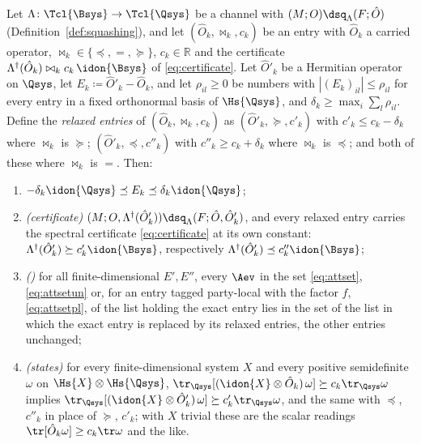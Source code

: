 \begin{lemma}\label{lem:row-relaxation}
Let $\Lambda\colon\Tcl{\Bsys}\to\Tcl{\Qsys}$ be a channel with
$(M;O)\dsq_{\Lambda}(F;\hat O)$ (Definition~\ref{def:squashing}), and let
$(\hat O_k,\bowtie_k,c_k)$ be an entry with $\hat O_k$ a carried operator,
$\bowtie_k\in\{\preceq,=,\succeq\}$, $c_k\in\mathbb{R}$ and the certificate
$\Lambda^{\dagger}(\hat O_k)\bowtie_kc_k\,\idon{\Bsys}$ of
\eqref{eq:certificate}. Let $\hat O'_k$ be a Hermitian operator on $\Qsys$,
let $E_k\coloneqq\hat O'_k-\hat O_k$, and let $\rho_{il}\ge0$ be numbers with
$|(E_k)_{il}|\le\rho_{il}$ for every entry in a fixed orthonormal basis of
$\Hs{\Qsys}$, and $\delta_k\ge\max_i\sum_l\rho_{il}$. Define the
\emph{relaxed entries} of $(\hat O_k,\bowtie_k,c_k)$ as
$(\hat O'_k,\succeq,c'_k)$ with $c'_k\le c_k-\delta_k$ where $\bowtie_k$ is
$\succeq$; $(\hat O'_k,\preceq,c''_k)$ with $c''_k\ge c_k+\delta_k$ where
$\bowtie_k$ is $\preceq$; and both of these where $\bowtie_k$ is $=$. Then:
\begin{enumerate}[label=(\roman*),leftmargin=2.4em]
\item $-\delta_k\idon{\Qsys}\preceq E_k\preceq\delta_k\idon{\Qsys}$;
\item \emph{(certificate)} $(M;O,\Lambda^{\dagger}(\hat O'_k))\dsq_{\Lambda}
  (F;\hat O,\hat O'_k)$, and every relaxed entry carries the spectral
  certificate \eqref{eq:certificate} at its own constant:
  $\Lambda^{\dagger}(\hat O'_k)\succeq c'_k\idon{\Bsys}$, respectively
  $\Lambda^{\dagger}(\hat O'_k)\preceq c''_k\idon{\Bsys}$;
\item \emph{()} for all finite-dimensional $E',E''$, every
  $\Aev$ in the set \eqref{eq:attset}, \eqref{eq:attsetun} or, for an entry
  tagged party-local with the factor $f$, \eqref{eq:attsetpl}, of the list
  holding the exact entry lies in the set of the list in which the exact
  entry is replaced by its relaxed entries, the other entries unchanged;
\item \emph{(states)} for every finite-dimensional system $X$ and every
  positive semidefinite $\omega$ on $\Hs{X}\otimes\Hs{\Qsys}$,
  $\tr_{\Qsys}[(\idon{X}\otimes\hat O_k)\,\omega]\succeq c_k\tr_{\Qsys}\omega$
  implies $\tr_{\Qsys}[(\idon{X}\otimes\hat O'_k)\,\omega]\succeq
  c'_k\tr_{\Qsys}\omega$, and the same with $\preceq$, $c''_k$ in place of
  $\succeq$, $c'_k$; with $X$ trivial these are the scalar readings
  $\tr[\hat O_k\omega]\ge c_k\tr\omega$ and the like.
\end{enumerate}
\end{lemma}

